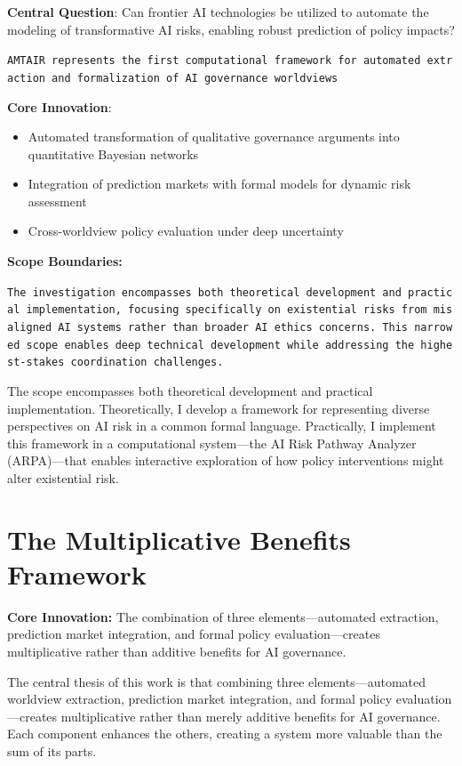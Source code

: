 \documentclass[
  11pt,
  letterpaper,
]{book}
\providecommand{\tightlist}{%
  \setlength{\itemsep}{0pt}\setlength{\parskip}{0pt}}
\begin{document}
\textbf{Central Question}: Can frontier AI technologies be utilized to
automate the modeling of transformative AI risks, enabling robust
prediction of policy impacts?

\texttt{AMTAIR\ represents\ the\ first\ computational\ framework\ for\ automated\ extraction\ and\ formalization\ of\ AI\ governance\ worldviews}

\textbf{Core Innovation}:

\begin{itemize}
\tightlist
\item
  Automated transformation of qualitative governance arguments into
  quantitative Bayesian networks
\item
  Integration of prediction markets with formal models for dynamic risk
  assessment
\item
  Cross-worldview policy evaluation under deep uncertainty
\end{itemize}

\textbf{Scope Boundaries:}

\texttt{The\ investigation\ encompasses\ both\ theoretical\ development\ and\ practical\ implementation,\ focusing\ specifically\ on\ existential\ risks\ from\ misaligned\ AI\ systems\ rather\ than\ broader\ AI\ ethics\ concerns.\ This\ narrowed\ scope\ enables\ deep\ technical\ development\ while\ addressing\ the\ highest-stakes\ coordination\ challenges.}

The scope encompasses both theoretical development and practical
implementation. Theoretically, I develop a framework for representing
diverse perspectives on AI risk in a common formal language.
Practically, I implement this framework in a computational system---the
AI Risk Pathway Analyzer (ARPA)---that enables interactive exploration
of how policy interventions might alter existential risk.

\section{The Multiplicative Benefits
Framework}\label{sec-multiplicative-benefits}

\textbf{Core Innovation:} The combination of three elements---automated
extraction, prediction market integration, and formal policy
evaluation---creates multiplicative rather than additive benefits for AI
governance.

The central thesis of this work is that combining three
elements---automated worldview extraction, prediction market
integration, and formal policy evaluation---creates multiplicative
rather than merely additive benefits for AI governance. Each component
enhances the others, creating a system more valuable than the sum of its
parts.
\end{document}
